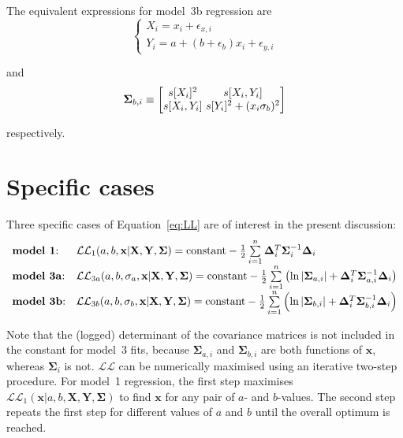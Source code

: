 \documentclass{article}
\begin{document}
The equivalent expressions for model~3b regression are
\begin{equation}
  \begin{cases}
    X_i = x_i + \epsilon_{x,i} \\
    Y_i = a + (b + \epsilon_b) x_i + \epsilon_{y,i}
  \end{cases}
  \label{eq:model3b}
\end{equation}

and
\begin{equation}
  \mathbf{\Sigma}_{b,i} \equiv
  \left[
    \begin{array}{@{}c@{~}c@{}}
      s[X_i]^2 & s[X_i,Y_i]\\
      s[X_i,Y_i] & s[Y_i]^2 + (x_i\sigma_b)^2
    \end{array}
    \right]
  \label{eq:model3bEi}
\end{equation}

\noindent respectively.

\section{Specific cases}\label{sec:specific}

Three specific cases of Equation~\ref{eq:LL} are of interest in the
present discussion:
\begin{equation}
  \begin{array}{ll}
    \mbox{\textbf{model~1}:} &
    \mathcal{LL}_1(a,b,\mathbf{x}|\mathbf{X},\mathbf{Y},\mathbf{\Sigma}) =
    \mbox{constant} - \frac{1}{2} \sum\limits_{i=1}^{n}
    \mathbf{\Delta}_i^T \mathbf{\Sigma}_i^{-1} \mathbf{\Delta}_i \\
    \mbox{\textbf{model~3a}:} &
    \mathcal{LL}_{3a}(a,b,\sigma_a,\mathbf{x}|\mathbf{X},\mathbf{Y},\mathbf{\Sigma}) =
    \mbox{constant} - \frac{1}{2} \sum\limits_{i=1}^{n}
    \left(\ln|\mathbf{\Sigma}_{a,i}| +
    \mathbf{\Delta}_{i}^T \mathbf{\Sigma}_{a,i}^{-1} \mathbf{\Delta}_{i} \right)\\
    \mbox{\textbf{model~3b}:} &
    \mathcal{LL}_{3b}(a,b,\sigma_b,\mathbf{x}|\mathbf{X},\mathbf{Y},\mathbf{\Sigma}) =
    \mbox{constant} - \frac{1}{2} \sum\limits_{i=1}^{n}
    \left(\ln|\mathbf{\Sigma}_{b,i}| +
    \mathbf{\Delta}_{i}^T \mathbf{\Sigma}_{b,i}^{-1} \mathbf{\Delta}_{i} \right)
  \end{array}
  \label{eq:specific}
\end{equation}

Note that the (logged) determinant of the covariance matrices is not
included in the constant for model~3 fits, because
$\mathbf{\Sigma}_{a,i}$ and $\mathbf{\Sigma}_{b,i}$ are both functions
of $\mathbf{x}$, whereas $\mathbf{\Sigma}_{i}$ is not.  $\mathcal{LL}$
can be numerically maximised using an iterative two-step
procedure. For model~1 regression, the first step maximises
$\mathcal{LL}_1(\mathbf{x}|a,b,\mathbf{X},\mathbf{Y},\mathbf{\Sigma})$
to find $\mathbf{x}$ for any pair of $a$- and $b$-values. The second
step repeats the first step for different values of $a$ and $b$ until
the overall optimum is reached.\medskip
\end{document}
